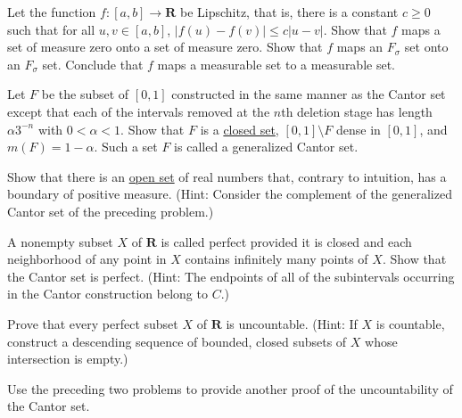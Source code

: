  \begin{exercise}[Royden 2.38][ex:royden2.38]
    Let the function $f : [a, b] \to \mathbf{R}$ be Lipschitz, that is, there is a constant $c \geq 0$ such that for all $u, v \in [a, b]$, $|f(u) - f(v)| \leq c|u - v|$. Show that $f$ maps a set of measure zero onto a set of measure zero. Show that $f$ maps an $F_{\sigma}$ set onto an $F_{\sigma}$ set. Conclude that $f$ maps a measurable set to a measurable set.
  \end{exercise}

  \begin{exercise}[Royden 2.39]
    Let $F$ be the subset of $[0, 1]$ constructed in the same manner as the Cantor set except that each of the intervals removed at the $n$th deletion stage has length $\alpha 3^{-n}$ with $0 < \alpha < 1$. Show that $F$ is a \hyperref[pst-def:closed]{closed set}, $[0, 1] \setminus F$ dense in $[0, 1]$, and $m(F) = 1 - \alpha$. Such a set $F$ is called a generalized Cantor set.
  \end{exercise}

  \begin{exercise}[Royden 2.40]
    Show that there is an \hyperref[pst-def:open-set]{open set} of real numbers that, contrary to intuition, has a boundary of positive measure. (Hint: Consider the complement of the generalized Cantor set of the preceding problem.)
  \end{exercise}

  \begin{exercise}[Royden 2.41]
    A nonempty subset $X$ of $\mathbf{R}$ is called perfect provided it is closed and each neighborhood of any point in $X$ contains infinitely many points of $X$. Show that the Cantor set is perfect. (Hint: The endpoints of all of the subintervals occurring in the Cantor construction belong to $C$.)
  \end{exercise}

  \begin{exercise}[Royden 2.42]
    Prove that every perfect subset $X$ of $\mathbf{R}$ is uncountable. (Hint: If $X$ is countable, construct a descending sequence of bounded, closed subsets of $X$ whose intersection is empty.)
  \end{exercise}

  \begin{exercise}[Royden 2.43]
    Use the preceding two problems to provide another proof of the uncountability of the Cantor set.
  \end{exercise}

